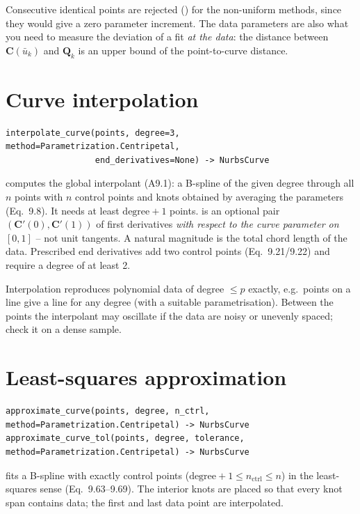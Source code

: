 Consecutive identical points are rejected () for the non-uniform methods,
since they would give a zero parameter increment. The data parameters are also what you need to
measure the deviation of a fit \emph{at the data}: the distance between $\mathbf C(\bar u_k)$ and
$\mathbf Q_k$ is an upper bound of the point-to-curve distance.

\section{Curve interpolation}\label{sec:interpolate-curve}

\begin{lstlisting}[style=text]
interpolate_curve(points, degree=3, method=Parametrization.Centripetal,
                  end_derivatives=None) -> NurbsCurve
\end{lstlisting}

 computes the global interpolant (A9.1): a B-spline of the given
degree through all $n$ points with $n$ control points and knots obtained by averaging the
parameters (Eq.~9.8). It needs at least $\text{degree}+1$ points.  is an
optional pair $(\mathbf C'(0), \mathbf C'(1))$ of first derivatives \emph{with respect to the
curve parameter on $[0,1]$} -- not unit tangents. A natural magnitude is the total chord length
of the data. Prescribed end derivatives add two control points (Eq.~9.21/9.22) and require a
degree of at least 2.

Interpolation reproduces polynomial data of degree $\le p$ exactly, e.g.\ points on a line give a
line for any degree (with a suitable parametrisation). Between the points the interpolant may
oscillate if the data are noisy or unevenly spaced; check it on a dense sample.

\section{Least-squares approximation}\label{sec:approximate-curve}

\begin{lstlisting}[style=text]
approximate_curve(points, degree, n_ctrl, method=Parametrization.Centripetal) -> NurbsCurve
approximate_curve_tol(points, degree, tolerance, method=Parametrization.Centripetal) -> NurbsCurve
\end{lstlisting}

 fits a B-spline with exactly  control points
($\text{degree}+1 \le n_\text{ctrl} \le n$) in the least-squares sense (Eq.~9.63--9.69). The
interior knots are placed so that every knot span contains data; the first and last data point
are interpolated.

